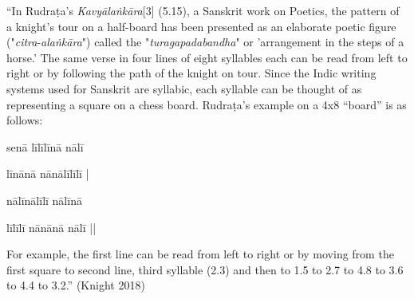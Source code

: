 \begin{myquote}
“In Rudraṭa's \textsl{Kavyālaṅkāra}[3] (5.15), a Sanskrit work on Poetics, the pattern of a knight's tour on a half-board has been presented as an elaborate poetic figure ("\textsl{citra}-\textsl{alaṅkāra}") called the "\textsl{turagapadabandha}" or 'arrangement in the steps of a horse.' The same verse in four lines of eight syllables each can be read from left to right or by following the path of the knight on tour. Since the Indic writing systems used for Sanskrit are syllabic, each syllable can be thought of as representing a square on a chess board. Rudraṭa's example on a 4x8 “board” is as follows:

\qquad senā līlīlīnā nālī

\qquad līnānā nānālīlīlī |

\qquad nālīnālīlī nālīnā

\qquad līlīlī nānānā nālī ||

For example, the first line can be read from left to right or by moving from the first square to second line, third syllable (2.3) and then to 1.5 to 2.7 to 4.8 to 3.6 to 4.4 to 3.2.” (Knight 2018) 
\end{myquote}

